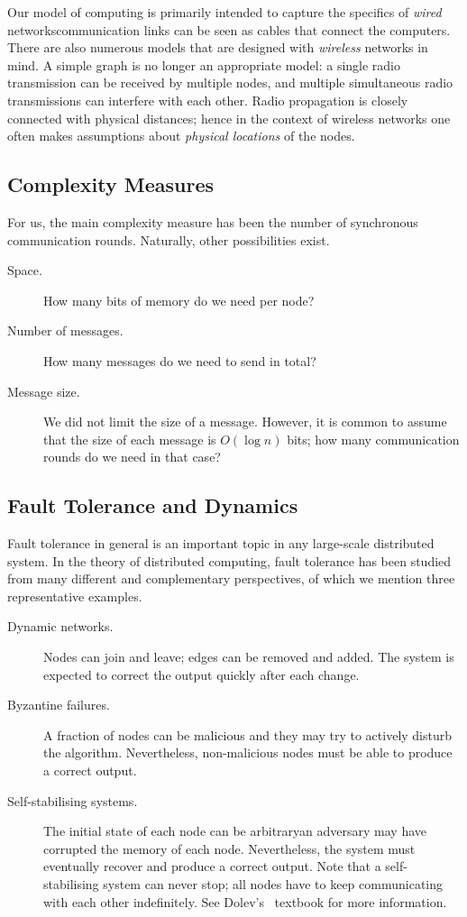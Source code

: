 Our model of computing is primarily intended to capture the specifics of \emph{wired} networks\mydash communication links can be seen as cables that connect the computers. There are also numerous models that are designed with \emph{wireless} networks in mind. A simple graph is no longer an appropriate model: a single radio transmission can be received by multiple nodes, and multiple simultaneous radio transmissions can interfere with each other. Radio propagation is closely connected with physical distances; hence in the context of wireless networks one often makes assumptions about \emph{physical locations} of the nodes.

\subsection{Complexity Measures}\label{ssec:next-compl-meas}

For us, the main complexity measure has been the number of synchronous communication rounds. Naturally, other possibilities exist.
\begin{description}
    \item[Space.] How many bits of memory do we need per node?
    \item[Number of messages.] How many messages do we need to send in total?
    \item[Message size.] We did not limit the size of a message. However, it is common to assume that the size of each message is $O(\log n)$ bits; how many communication rounds do we need in that case?
\end{description}

\subsection{Fault Tolerance and Dynamics}\label{ssec:next-fault}

Fault tolerance in general is an important topic in any large-scale distributed system. In the theory of distributed computing, fault tolerance has been studied from many different and complementary perspectives, of which we mention three representative examples.
\begin{description}
    \item[Dynamic networks.] Nodes can join and leave; edges can be removed and added. The system is expected to correct the output quickly after each change.
    \item[Byzantine failures.] A fraction of nodes can be malicious and they may try to actively disturb the algorithm. Nevertheless, non-malicious nodes must be able to produce a correct output.
    \item[Self-stabilising systems.] The initial state of each node can be arbitrary\mydash an adversary may have corrupted the memory of each node. Nevertheless, the system must eventually recover and produce a correct output. Note that a self-stabilising system can never stop; all nodes have to keep communicating with each other indefinitely. See Dolev's~\cite{dolev00self-stabilization} textbook for more information.
\end{description}

